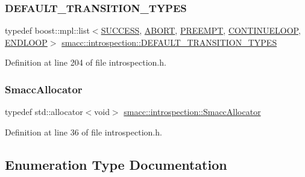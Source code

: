 \subsubsection{\texorpdfstring{D\+E\+F\+A\+U\+L\+T\+\_\+\+T\+R\+A\+N\+S\+I\+T\+I\+O\+N\+\_\+\+T\+Y\+P\+ES}{DEFAULT\_TRANSITION\_TYPES}}
{\footnotesize\ttfamily typedef boost\+::mpl\+::list$<$\hyperlink{structsmacc_1_1default__transition__tags_1_1SUCCESS}{S\+U\+C\+C\+E\+SS}, \hyperlink{structsmacc_1_1default__transition__tags_1_1ABORT}{A\+B\+O\+RT}, \hyperlink{structsmacc_1_1default__transition__tags_1_1PREEMPT}{P\+R\+E\+E\+M\+PT}, \hyperlink{structsmacc_1_1default__transition__tags_1_1CONTINUELOOP}{C\+O\+N\+T\+I\+N\+U\+E\+L\+O\+OP}, \hyperlink{structsmacc_1_1default__transition__tags_1_1ENDLOOP}{E\+N\+D\+L\+O\+OP}$>$ \hyperlink{namespacesmacc_1_1introspection_ac678f3918f2036c45d7d0da7f5afce83}{smacc\+::introspection\+::\+D\+E\+F\+A\+U\+L\+T\+\_\+\+T\+R\+A\+N\+S\+I\+T\+I\+O\+N\+\_\+\+T\+Y\+P\+ES}}



Definition at line 204 of file introspection.\+h.

\mbox{\label{namespacesmacc_1_1introspection_aa4064aa24887868c6347efc004c08986}} 
\subsubsection{\texorpdfstring{Smacc\+Allocator}{SmaccAllocator}}
{\footnotesize\ttfamily typedef std\+::allocator$<$void$>$ \hyperlink{namespacesmacc_1_1introspection_aa4064aa24887868c6347efc004c08986}{smacc\+::introspection\+::\+Smacc\+Allocator}}



Definition at line 36 of file introspection.\+h.



\subsection{Enumeration Type Documentation}
\mbox{\label{namespacesmacc_1_1introspection_a710cf406873961567c11027582c7f720}} 
